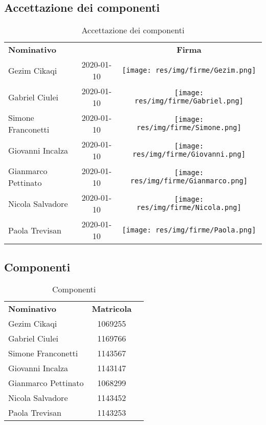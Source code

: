 \subsection{Accettazione dei componenti}
\begin{longtable}{|p{5cm}|c|c|}
	\arrayrulecolor{white}
	\caption{Accettazione dei componenti} \\
	\hline
	\rowcolor{header}
	\textbf{Nominativo} & \centering{\textbf{Data di accettazione}} & \textbf{Firma}
	\tabularnewline
	\endfirsthead
	\hline
	Gezim Cikaqi & 2020-01-10 & \texttt{[image: res/img/firme/Gezim.png]} \\
	Gabriel Ciulei & 2020-01-10 & \texttt{[image: res/img/firme/Gabriel.png]} \\
	Simone Franconetti & 2020-01-10 & \texttt{[image: res/img/firme/Simone.png]} \\
	Giovanni Incalza & 2020-01-10 & \texttt{[image: res/img/firme/Giovanni.png]} \\
	Gianmarco Pettinato & 2020-01-10 &  \texttt{[image: res/img/firme/Gianmarco.png]} \\
	Nicola Salvadore & 2020-01-10 & \texttt{[image: res/img/firme/Nicola.png]} \\
	Paola Trevisan & 2020-01-10 & \texttt{[image: res/img/firme/Paola.png]}\\
	\hline
\end{longtable}

\subsection{Componenti}
\begin{longtable}{|p{5cm}|c|c|}
	\arrayrulecolor{white}
	\caption{Componenti} \\
	\hline
	\rowcolor{header}
	\textbf{Nominativo} & \textbf{Matricola}
	\tabularnewline
	\endfirsthead
	\hline
	Gezim Cikaqi & 1069255 \\
	Gabriel Ciulei & 1169766 \\
	Simone Franconetti & 1143567\\
	Giovanni Incalza & 1143147 \\
	Gianmarco Pettinato & 1068299 \\
	Nicola Salvadore & 1143452 \\
	Paola Trevisan & 1143253\\
	\hline
\end{longtable}